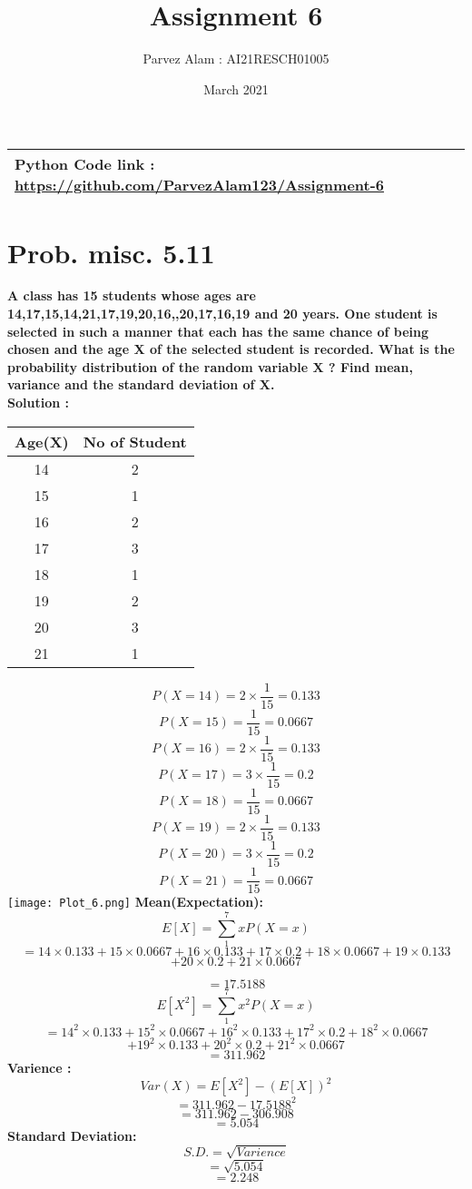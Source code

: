 \documentclass{article}
\title{Assignment 6}
\author{Parvez Alam : AI21RESCH01005 }
\date{March 2021}
\begin{document}
\maketitle
\begin{multicols}{2}
\begin{center}
    \begin{tabular}{|p{5cm}|}
         \hline
         Python Code link :
         \url{https://github.com/ParvezAlam123/Assignment-6} \\
         \hline
          
    \end{tabular}
\end{center}

\section{Prob. misc. 5.11}
\textbf{A class has 15 students whose ages are 14,17,15,14,21,17,19,20,16,,20,17,16,19 and 20 years. One student is selected in such a manner that each has the same chance of being chosen and the age X of the selected student is recorded. What is the probability distribution of the random variable X ? Find mean, variance and the standard deviation of X.} \\ 
\textbf{Solution :} 
\begin{center}
    \begin{tabular}{|c|c|}
       \hline
         Age(X) & No of Student  \\
         \hline
       14  & 2 \\
       \hline
       15 & 1  \\
       \hline
       16 & 2  \\
       \hline
       17 & 3 \\
       \hline
       18 & 1 \\
       \hline
       19 & 2  \\
       \hline
       20 & 3   \\
       \hline
       21 & 1  \\
       \hline
    \end{tabular}
\end{center}
\[P(X=14) = 2\times \frac{1}{15}= 0.133\] 
\[P(X=15)= \frac{1}{15} = 0.0667\] 
\[P(X=16)= 2\times \frac{1}{15} =0.133 \]  
\[P(X=17)= 3\times \frac{1}{15}=0.2\]
\[P(X=18)=\frac{1}{15}=0.0667\]
\[P(X=19)=2\times \frac{1}{15}=0.133\]
\[P(X=20)=3\times \frac{1}{15}=0.2\]
\[P(X=21)=\frac{1}{15}=0.0667\] 
\texttt{[image: Plot\_6.png]}
\textbf{Mean(Expectation): } \\
\[E[X]=\sum_1^7 xP(X=x)\]
\[=14\times0.133+15\times0.0667+16\times0.133+17\times0.2+18\times0.0667+19\times0.133\] \[+20\times0.2+21\times0.0667\]

\[=17.5188\]
\[E[X^2]=\sum_1^7x^2P(X=x)\]
\[=14^2\times0.133+15^2\times0.0667+16^2\times0.133+17^2\times0.2+18^2\times0.0667\]\[+19^2\times0.133+20^2\times0.2+21^2\times0.0667\]
\[=311.962\]
\textbf{Varience :}
\[Var(X)=E[X^2]-(E[X])^2\]
\[=311.962-17.5188^2\]
\[=311.962-306.908\]
\[=5.054\]
\textbf{Standard Deviation: }
\[S.D.= \sqrt{Varience}\]
\[=\sqrt{5.054}\]
\[=2.248\]

\end{multicols}
\end{document}
